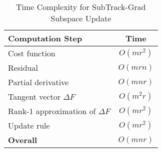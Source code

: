 \begin{table}[H]
\vskip 0.15in
\caption{\small Time Complexity for SubTrack-Grad Subspace Update}
\vskip 0.15in
\label{tab:time-subtrack-update-step}
\begin{center}

\begin{tabular}{l|c}
\toprule
\bf Computation Step  & \bf Time \\
\midrule
\midrule
Cost function  & $O(mr^2)$\\
\midrule
Residual & $O(mrn)$\\
\midrule
Partial derivative & $O(mnr)$\\
\midrule
Tangent vector $\Delta F$  & $O(m^2r)$\\
\midrule
Rank-$1$ approximation of $\Delta F$  & $O(mr^2)$\\
\midrule
Update rule   & $O(mr^2)$\\ 
\midrule
\midrule
\bf Overall  &  $O(mnr)$\\
\bottomrule 
\end{tabular}
\end{center}
\vskip -0.1in
\end{table}